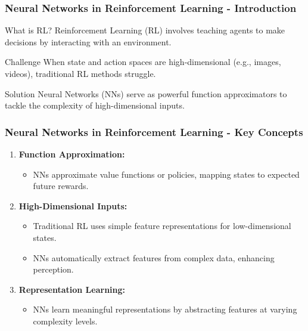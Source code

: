 \documentclass[aspectratio=169]{beamer}
\begin{document}
\begin{frame}[fragile]
    \frametitle{Neural Networks in Reinforcement Learning - Introduction}
    \begin{block}{What is RL?}
        Reinforcement Learning (RL) involves teaching agents to make decisions by interacting with an environment.
    \end{block}
    \begin{block}{Challenge}
        When state and action spaces are high-dimensional (e.g., images, videos), traditional RL methods struggle.
    \end{block}
    \begin{block}{Solution}
        Neural Networks (NNs) serve as powerful function approximators to tackle the complexity of high-dimensional inputs.
    \end{block}
\end{frame}

\begin{frame}[fragile]
    \frametitle{Neural Networks in Reinforcement Learning - Key Concepts}
    \begin{enumerate}
        \item \textbf{Function Approximation:}
        \begin{itemize}
            \item NNs approximate value functions or policies, mapping states to expected future rewards.
        \end{itemize}
        
        \item \textbf{High-Dimensional Inputs:}
        \begin{itemize}
            \item Traditional RL uses simple feature representations for low-dimensional states. 
            \item NNs automatically extract features from complex data, enhancing perception.
        \end{itemize}
        
        \item \textbf{Representation Learning:}
        \begin{itemize}
            \item NNs learn meaningful representations by abstracting features at varying complexity levels.
        \end{itemize}
    \end{enumerate}
\end{frame}
\end{document}
